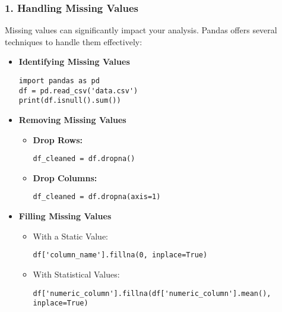 \documentclass[aspectratio=169]{beamer}
\begin{document}
\begin{frame}[fragile]
    \frametitle{1. Handling Missing Values}
    Missing values can significantly impact your analysis. Pandas offers several techniques to handle them effectively:
    
    \begin{itemize}
        \item \textbf{Identifying Missing Values}
        \begin{lstlisting}
import pandas as pd
df = pd.read_csv('data.csv')
print(df.isnull().sum())
        \end{lstlisting}
        
        \item \textbf{Removing Missing Values}
        \begin{itemize}
            \item \textbf{Drop Rows:}
            \begin{lstlisting}
df_cleaned = df.dropna()
            \end{lstlisting}
            \item \textbf{Drop Columns:}
            \begin{lstlisting}
df_cleaned = df.dropna(axis=1)
            \end{lstlisting}
        \end{itemize}
        
        \item \textbf{Filling Missing Values}
        \begin{itemize}
            \item With a Static Value:
            \begin{lstlisting}
df['column_name'].fillna(0, inplace=True)
            \end{lstlisting}
            \item With Statistical Values:
            \begin{lstlisting}
df['numeric_column'].fillna(df['numeric_column'].mean(), inplace=True)
            \end{lstlisting}
        \end{itemize}
    \end{itemize}
\end{frame}
\end{document}
